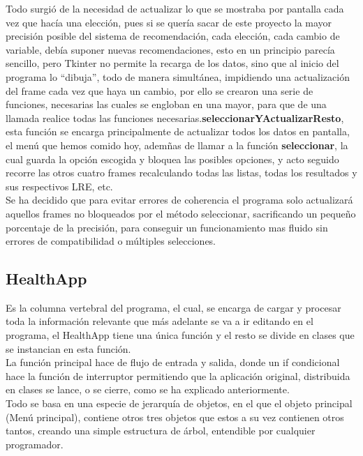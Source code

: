 Todo surgió de la necesidad de actualizar lo que se mostraba por pantalla cada vez que hacía una elección, pues si se quería sacar de este proyecto la mayor precisión posible del sistema de recomendación, cada elección, cada cambio de variable, debía suponer nuevas recomendaciones, esto en un principio parecía sencillo, pero Tkinter no permite la recarga de los datos, sino que al inicio del programa lo “dibuja”, todo de manera simultánea, impidiendo una actualización del frame cada vez que haya un cambio, por ello se crearon una serie de funciones, necesarias las cuales se engloban en una mayor, para que de una llamada realice todas las funciones necesarias.\textbf{seleccionarYActualizarResto}, esta función se encarga principalmente de actualizar todos los datos en pantalla, el menú que hemos comido hoy, ademñas de llamar a la función  \textbf{seleccionar}, la cual guarda la opción escogida y bloquea las posibles opciones, y acto seguido recorre las otros cuatro frames recalculando todas las listas, todas los resultados y sus respectivos LRE, etc. \\

Se ha decidido que para evitar errores de coherencia el programa solo actualizará aquellos frames no bloqueados por el método seleccionar, sacrificando un pequeño porcentaje de la precisión, para conseguir un funcionamiento mas fluido sin errores de compatibilidad o múltiples selecciones.\\
\subsection{HealthApp}
Es la columna vertebral del programa, el cual, se encarga de cargar y procesar toda la información relevante que más adelante se va a ir editando en el programa, el HealthApp tiene una única función y el resto se divide en clases que se instancian en esta función.\\

La función principal hace de flujo de entrada y salida, donde un if condicional hace la función de interruptor permitiendo que la aplicación original, distribuida en clases se lance, o se cierre, como se ha explicado anteriormente.\\

Todo se basa en una especie de jerarquía de objetos, en el que el objeto principal (Menú principal), contiene otros tres objetos que estos a su vez contienen otros tantos, creando una simple estructura de árbol, entendible por cualquier programador. \\

